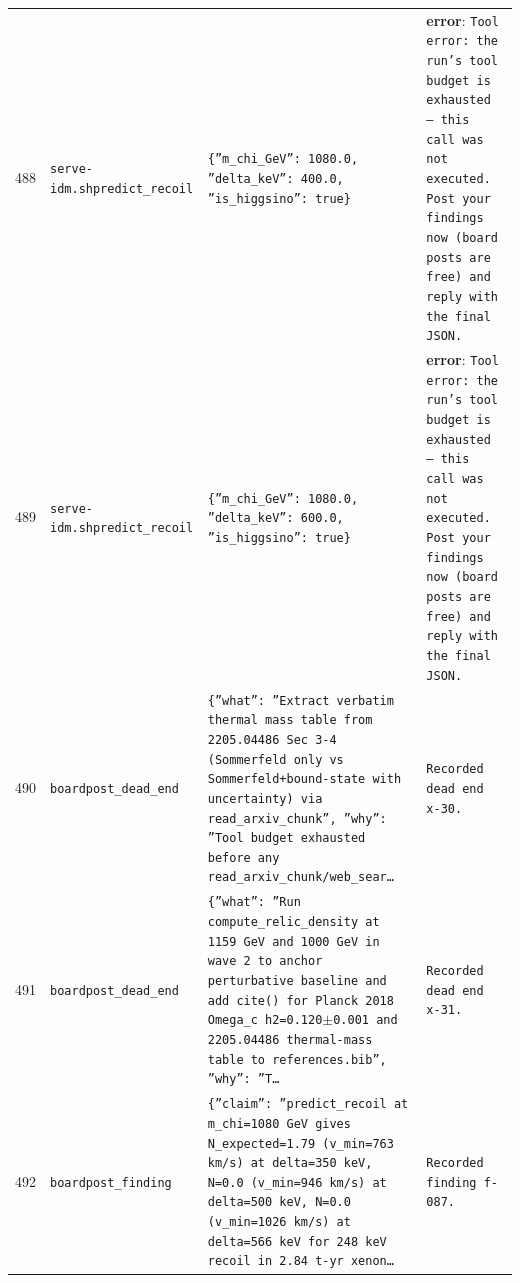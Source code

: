\documentclass[11pt,a4paper]{article}
\begin{document}
\begin{longtable}{@{}p{}p{}p{}p{}@{}}
488 & \texttt{serve-idm.sh}\newline\texttt{predict\_\allowbreak{}recoil} & \texttt{\{''m\_\allowbreak{}chi\_\allowbreak{}GeV'':\allowbreak{} 1080.0,\allowbreak{} ''delta\_\allowbreak{}keV'':\allowbreak{} 400.0,\allowbreak{} ''is\_\allowbreak{}higgsino'':\allowbreak{} true\}\allowbreak{}} & \textbf{error}: \texttt{Tool error:\allowbreak{} the run's tool budget is exhausted --- this call was not executed. Post your findings now (board posts are free)\allowbreak{} and reply with the final JSON.} \\
489 & \texttt{serve-idm.sh}\newline\texttt{predict\_\allowbreak{}recoil} & \texttt{\{''m\_\allowbreak{}chi\_\allowbreak{}GeV'':\allowbreak{} 1080.0,\allowbreak{} ''delta\_\allowbreak{}keV'':\allowbreak{} 600.0,\allowbreak{} ''is\_\allowbreak{}higgsino'':\allowbreak{} true\}\allowbreak{}} & \textbf{error}: \texttt{Tool error:\allowbreak{} the run's tool budget is exhausted --- this call was not executed. Post your findings now (board posts are free)\allowbreak{} and reply with the final JSON.} \\
490 & \texttt{board}\newline\texttt{post\_\allowbreak{}dead\_\allowbreak{}end} & \texttt{\{''what'':\allowbreak{} ''Extract verbatim thermal mass table from 2205.04486 Sec 3-4 (Sommerfeld only vs Sommerfeld+bound-state with uncertainty)\allowbreak{} via read\_\allowbreak{}arxiv\_\allowbreak{}chunk'',\allowbreak{} ''why'':\allowbreak{} ''Tool budget exhausted before any read\_\allowbreak{}arxiv\_\allowbreak{}chunk/\allowbreak{}web\_\allowbreak{}sear\ldots{}\allowbreak{}} & \texttt{Recorded dead end x-30.} \\
491 & \texttt{board}\newline\texttt{post\_\allowbreak{}dead\_\allowbreak{}end} & \texttt{\{''what'':\allowbreak{} ''Run compute\_\allowbreak{}relic\_\allowbreak{}density at 1159 GeV and 1000 GeV in wave 2 to anchor perturbative baseline and add cite()\allowbreak{} for Planck 2018 Omega\_\allowbreak{}c h2=\allowbreak{}0.120$\pm$0.001 and 2205.04486 thermal-mass table to references.bib'',\allowbreak{} ''why'':\allowbreak{} ''T\ldots{}\allowbreak{}} & \texttt{Recorded dead end x-31.} \\
492 & \texttt{board}\newline\texttt{post\_\allowbreak{}finding} & \texttt{\{''claim'':\allowbreak{} ''predict\_\allowbreak{}recoil at m\_\allowbreak{}chi=\allowbreak{}1080 GeV gives N\_\allowbreak{}expected=\allowbreak{}1.79 (v\_\allowbreak{}min=\allowbreak{}763 km/\allowbreak{}s)\allowbreak{} at delta=\allowbreak{}350 keV,\allowbreak{} N=\allowbreak{}0.0 (v\_\allowbreak{}min=\allowbreak{}946 km/\allowbreak{}s)\allowbreak{} at delta=\allowbreak{}500 keV,\allowbreak{} N=\allowbreak{}0.0 (v\_\allowbreak{}min=\allowbreak{}1026 km/\allowbreak{}s)\allowbreak{} at delta=\allowbreak{}566 keV for 248 keV recoil in 2.84 t-yr xenon\ldots{}\allowbreak{}} & \texttt{Recorded finding f-087.} \\

\end{longtable}
\end{document}

